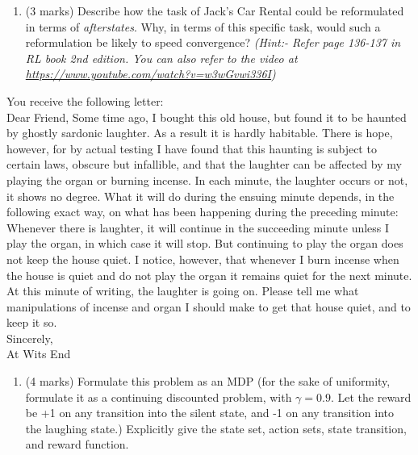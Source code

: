 \documentclass[addpoints,12pt,solution]{exam}
\begin{document}
\begin{questions}
\begin{enumerate}[label=(\alph*)]
\begin{solution}


\end{solution}

\item (3 marks) Describe how the task of Jack’s Car Rental could be reformulated in terms of \textit{afterstates}. Why, in terms of this specific task, would such a reformulation be likely to speed convergence? \textit{(Hint:- Refer page 136-137 in RL book 2nd edition. You can also refer to the video at \href{https://www.youtube.com/watch?v=w3wGvwi336I}{https://www.youtube.com/watch?v=w3wGvwi336I})}

\begin{solution}

\end{solution}

\end{enumerate}

 You receive the following letter:\\
Dear Friend, Some time ago, I bought this old house, but found it to be haunted by
ghostly sardonic laughter. As a result it is hardly habitable. There is hope, however,
for by actual testing I have found that this haunting is subject to certain laws, obscure
but infallible, and that the laughter can be affected by my playing the organ or burning
incense. In each minute, the laughter occurs or not, it shows no degree. What it will
do during the ensuing minute depends, in the following exact way, on what has been
happening during the preceding minute: Whenever there is laughter, it will continue in
the succeeding minute unless I play the organ, in which case it will stop. But continuing
to play the organ does not keep the house quiet. I notice, however, that whenever I
burn incense when the house is quiet and do not play the organ it remains quiet for the
next minute. At this minute of writing, the laughter is going on. Please tell me what
manipulations of incense and organ I should make to get that house quiet, and to keep
it so.\\
Sincerely,\\
At Wits End

\begin{enumerate}[label=(\alph*)]

\item (4 marks) Formulate this problem as an MDP (for the sake of uniformity, formulate it as a
continuing discounted problem, with $\gamma= 0.9$. Let the reward be +1 on any transition
into the silent state, and -1 on any transition into the laughing state.) Explicitly give the
state set, action sets, state transition, and reward function.


\end{enumerate}
\end{questions}
\end{document}
